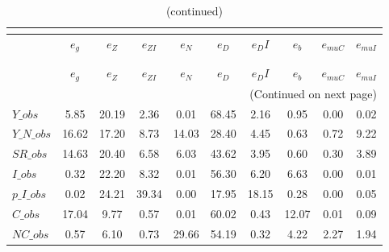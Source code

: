  
\begin{center}
\begin{longtable}{lccccccccc} 
\caption{VARIANCE DECOMPOSITION (in percent)}\\
 \label{Table:th_var_decomp_uncond}\\
\toprule 
$               $	 & 	 $        {e_g}$	 & 	 $        {e_Z}$	 & 	 $     {e_{ZI}}$	 & 	 $        {e_N}$	 & 	 $        {e_D}$	 & 	 $       {e_DI}$	 & 	 $        {e_b}$	 & 	 $    {e_{muC}}$	 & 	 $    {e_{muI}}$\\
\midrule \endfirsthead 
\caption{(continued)}\\
 \toprule \\ 
$               $	 & 	 $        {e_g}$	 & 	 $        {e_Z}$	 & 	 $     {e_{ZI}}$	 & 	 $        {e_N}$	 & 	 $        {e_D}$	 & 	 $       {e_DI}$	 & 	 $        {e_b}$	 & 	 $    {e_{muC}}$	 & 	 $    {e_{muI}}$\\
\midrule \endhead 
\midrule \multicolumn{10}{r}{(Continued on next page)} \\ \bottomrule \endfoot 
\bottomrule \endlastfoot 
$Y\_obs         $	 & 	         5.85	 & 	        20.19	 & 	         2.36	 & 	         0.01	 & 	        68.45	 & 	         2.16	 & 	         0.95	 & 	         0.00	 & 	         0.02 \\ 
$Y\_N\_obs      $	 & 	        16.62	 & 	        17.20	 & 	         8.73	 & 	        14.03	 & 	        28.40	 & 	         4.45	 & 	         0.63	 & 	         0.72	 & 	         9.22 \\ 
$SR\_obs        $	 & 	        14.63	 & 	        20.40	 & 	         6.58	 & 	         6.03	 & 	        43.62	 & 	         3.95	 & 	         0.60	 & 	         0.30	 & 	         3.89 \\ 
$I\_obs         $	 & 	         0.32	 & 	        22.20	 & 	         8.32	 & 	         0.01	 & 	        56.30	 & 	         6.20	 & 	         6.63	 & 	         0.00	 & 	         0.01 \\ 
$p\_I\_obs      $	 & 	         0.02	 & 	        24.21	 & 	        39.34	 & 	         0.00	 & 	        17.95	 & 	        18.15	 & 	         0.28	 & 	         0.00	 & 	         0.05 \\ 
$C\_obs         $	 & 	        17.04	 & 	         9.77	 & 	         0.57	 & 	         0.01	 & 	        60.02	 & 	         0.43	 & 	        12.07	 & 	         0.01	 & 	         0.09 \\ 
$NC\_obs        $	 & 	         0.57	 & 	         6.10	 & 	         0.73	 & 	        29.66	 & 	        54.19	 & 	         0.32	 & 	         4.22	 & 	         2.27	 & 	         1.94 \\ 

\end{longtable}
\end{center}
